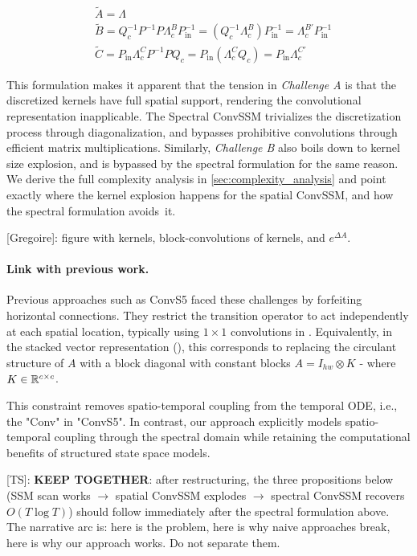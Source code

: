 \documentclass{article}
\newcommand{\greg}[1]{{\color{indigo}[Gregoire]: #1}}
\newcommand{\TS}[1]{{\color{pink}[TS]: #1}}
\begin{document}
\begin{align}
\label{eq:convssm}
&\boxed{\widetilde{A} = \Lambda} \\
&\widetilde{B} = Q_c^{-1} P^{-1} P \Lambda^B_c P_{\mathrm{in}}^{-1} = \left(Q_c^{-1} \Lambda^B_c\right) P_{\mathrm{in}}^{-1} \boxed{= \Lambda^{B'}_c P_{\mathrm{in}}^{-1}} \\
&\widetilde{C} = P_{\mathrm{in}} \Lambda^C_c P^{-1} P Q_c = P_{\mathrm{in}} \left(\Lambda^C_c Q_c\right) \boxed{= P_{\mathrm{in}} \Lambda^{C'}_c}
\end{align}

This formulation makes it apparent that the tension in \emph{Challenge A} is that the discretized kernels have full spatial support, rendering the convolutional representation inapplicable. The Spectral ConvSSM trivializes the discretization process through diagonalization, and bypasses prohibitive convolutions through efficient matrix multiplications.
%
Similarly, \emph{Challenge B} also boils down to kernel size explosion, and is bypassed by the spectral formulation for the same reason. We derive the full complexity analysis in \cref{sec:complexity_analysis} and point exactly where the kernel explosion happens for the spatial ConvSSM, and how the spectral formulation avoids~it.

\greg{figure with kernels, block-convolutions of kernels, and $e^{\Delta A}$.}

\paragraph{Link with previous work.}
Previous approaches such as ConvS5 \citep{smith2023convs5} faced these challenges by forfeiting horizontal connections. They restrict the transition operator to act independently at each spatial location, typically using $1 \!\times\! 1$ convolutions in . Equivalently, in the stacked vector representation (), this corresponds to replacing the circulant structure of $A$ with a block diagonal with constant blocks $A = I_{hw} \otimes K$ - where $K \in \mathbb{R}^{c \times c}$.

This constraint removes spatio-temporal coupling from the temporal ODE, i.e., the "Conv" in "ConvS5". In contrast, our approach explicitly models spatio-temporal coupling through the spectral domain while retaining the computational benefits of structured state space models.

\TS{\textbf{KEEP TOGETHER}: after restructuring, the three propositions below (SSM scan works $\to$ spatial ConvSSM explodes $\to$ spectral ConvSSM recovers $O(T \log T)$) should follow immediately after the spectral formulation above. The narrative arc is: here is the problem, here is why naive approaches break, here is why our approach works. Do not separate them.}
\end{document}
